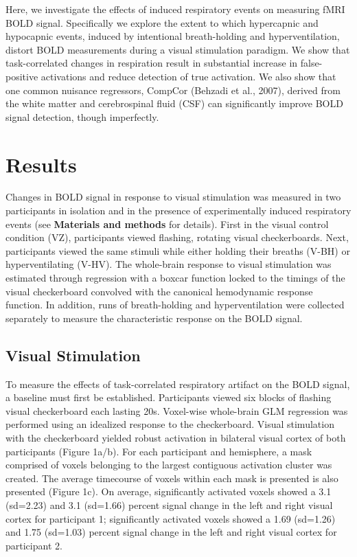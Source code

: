 \documentclass[9pt]{NEU502b-fmri}
\begin{document}
Here, we investigate the effects of induced respiratory events on measuring fMRI BOLD signal. Specifically we explore the extent to which hypercapnic and hypocapnic events, induced by intentional breath-holding and hyperventilation, distort BOLD measurements during a visual stimulation paradigm. We show that task-correlated changes in respiration result in substantial increase in false-positive activations and reduce detection of true activation. We also show that one common nuisance regressors, CompCor (Behzadi et al., 2007), derived from the white matter and cerebrospinal fluid (CSF) can significantly improve BOLD signal detection, though imperfectly. 

\section{Results}
Changes in BOLD signal in response to visual stimulation was measured in two participants in isolation and in the presence of experimentally induced respiratory events (see \textbf{Materials and methods} for details). First in the visual control condition (VZ), participants viewed flashing, rotating visual checkerboards. Next, participants viewed the same stimuli while either holding their breaths (V-BH) or hyperventilating (V-HV). The whole-brain response to visual stimulation was estimated through regression with a boxcar function locked to the timings of the visual checkerboard convolved with the canonical hemodynamic response function. In addition,  runs of breath-holding and hyperventilation were collected separately to measure the characteristic response on the BOLD signal.  


\subsection{Visual Stimulation}
To measure the effects of task-correlated respiratory artifact on the BOLD signal, a baseline must first be established. Participants viewed six blocks of flashing visual checkerboard each lasting 20s. Voxel-wise whole-brain GLM regression was performed using an idealized response to the checkerboard. Visual stimulation with the checkerboard yielded robust activation in bilateral visual cortex of both participants (Figure 1a/b).  For each participant and hemisphere, a mask comprised of voxels belonging to the largest contiguous activation cluster was created. The average timecourse of voxels within each mask is presented is also presented (Figure 1c). On average, significantly activated voxels showed a 3.1 (sd=2.23) and 3.1 (sd=1.66) percent signal change in the left and right visual cortex for participant 1;  significantly activated voxels showed a 1.69 (sd=1.26) and 1.75 (sd=1.03) percent signal change in the left and right visual cortex for participant 2. 
\end{document}

